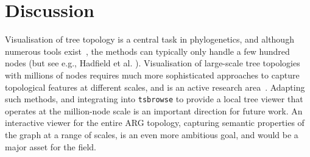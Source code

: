 \documentclass[unnumsec,webpdf,contemporary,large,namedate]{oup-authoring-template}%
\begin{document}
\section{Discussion} \label{sec:Discussion}
Visualisation of tree topology is a central task in phylogenetics,
and although numerous tools
exist~\citep[e.g.][]{huson2007dendroscope,vaughan2017icytree},
the methods can typically only handle a few hundred nodes 
(but see e.g., Hadfield et al. \citep{hadfield2018nextstrain}).
Visualisation of large-scale tree topologies with millions of nodes
requires much more sophisticated approaches
to capture topological features at different scales,
and is an active research area~\citep{wong2022dynamic,kramer2023treenome}.
Adapting such methods, and integrating into \texttt{tsbrowse} to provide
a local tree viewer that operates at the million-node scale
is an important direction for future work.
An interactive viewer for the entire ARG topology, capturing
semantic properties of the graph at a range of scales, is an even more
ambitious goal, and would be a major asset for the field.


\end{document}
